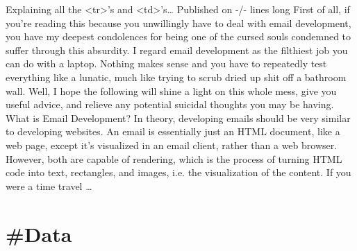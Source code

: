 \documentclass[10pt,a4paper]{article}
\begin{document}
\begin{multicols}{2}
Explaining all the <tr>'s and <td>'s…
Published on
-/- lines long
First of all, if you're reading this because you unwillingly have to deal with email development, you have my deepest condolences for being one of the cursed souls condemned to suffer through this absurdity.
I regard email development as the filthiest job you can do with a laptop. Nothing makes sense and you have to repeatedly test everything like a lunatic, much like trying to scrub dried up shit off a bathroom wall.
Well, I hope the following will shine a light on this whole mess, give you useful advice, and relieve any potential suicidal thoughts you may be having.
What is Email Development?
In theory, developing emails should be very similar to developing websites. An email is essentially just an HTML document, like a web page, except it's visualized in an email client, rather than a web browser. However, both are capable of rendering, which is the process of turning HTML code into text, rectangles, and images, i.e. the visualization of the content.
If you were a time travel
\dots\par
\end{multicols}

\newpage
\section{\#Data}
\end{document}
